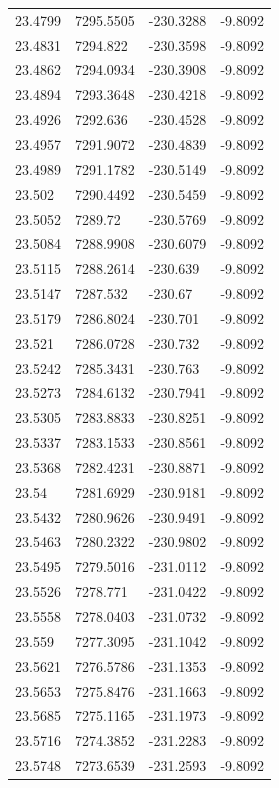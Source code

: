 \begin{table}[H]
\begin{tabular}{llll}
23.4799 & 7295.5505 & -230.3288 & -9.8092 \\
23.4831 & 7294.822 & -230.3598 & -9.8092 \\
23.4862 & 7294.0934 & -230.3908 & -9.8092 \\
23.4894 & 7293.3648 & -230.4218 & -9.8092 \\
23.4926 & 7292.636 & -230.4528 & -9.8092 \\
23.4957 & 7291.9072 & -230.4839 & -9.8092 \\
23.4989 & 7291.1782 & -230.5149 & -9.8092 \\
23.502 & 7290.4492 & -230.5459 & -9.8092 \\
23.5052 & 7289.72 & -230.5769 & -9.8092 \\
23.5084 & 7288.9908 & -230.6079 & -9.8092 \\
23.5115 & 7288.2614 & -230.639 & -9.8092 \\
23.5147 & 7287.532 & -230.67 & -9.8092 \\
23.5179 & 7286.8024 & -230.701 & -9.8092 \\
23.521 & 7286.0728 & -230.732 & -9.8092 \\
23.5242 & 7285.3431 & -230.763 & -9.8092 \\
23.5273 & 7284.6132 & -230.7941 & -9.8092 \\
23.5305 & 7283.8833 & -230.8251 & -9.8092 \\
23.5337 & 7283.1533 & -230.8561 & -9.8092 \\
23.5368 & 7282.4231 & -230.8871 & -9.8092 \\
23.54 & 7281.6929 & -230.9181 & -9.8092 \\
23.5432 & 7280.9626 & -230.9491 & -9.8092 \\
23.5463 & 7280.2322 & -230.9802 & -9.8092 \\
23.5495 & 7279.5016 & -231.0112 & -9.8092 \\
23.5526 & 7278.771 & -231.0422 & -9.8092 \\
23.5558 & 7278.0403 & -231.0732 & -9.8092 \\
23.559 & 7277.3095 & -231.1042 & -9.8092 \\
23.5621 & 7276.5786 & -231.1353 & -9.8092 \\
23.5653 & 7275.8476 & -231.1663 & -9.8092 \\
23.5685 & 7275.1165 & -231.1973 & -9.8092 \\
23.5716 & 7274.3852 & -231.2283 & -9.8092 \\
23.5748 & 7273.6539 & -231.2593 & -9.8092 \\

\end{tabular}
\end{table}
